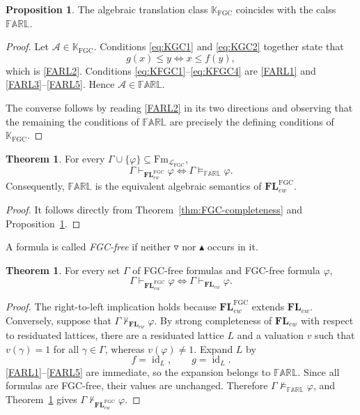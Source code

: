 \documentclass[final,12pt,times]{elsarticle}
\theoremstyle{plain}
\theoremstyle{definition}
\newtheorem{theorem}[definition]{Theorem}
\newtheorem{proposition}[definition]{Proposition}
\theoremstyle{break}
\newcommand{\FARL}{\mathbb{FARL}}
\begin{document}
\begin{proposition}\label{prop:identify-KFGC-FARL}
The algebraic translation class $\mathbb K_{\mathrm{FGC}}$ coincides with the calss
$\FARL$.
\end{proposition}

\begin{proof}
Let $\mathscr{A}\in\mathbb K_{\mathrm{FGC}}$.  Conditions
\eqref{eq:KGC1} and \eqref{eq:KGC2} together state that
\[
 g(x)\le y\Longleftrightarrow x\le f(y),
\]
which is \eqref{FARL2}.  Conditions
\eqref{eq:KFGC1}--\eqref{eq:KFGC4} are
\eqref{FARL1} and \eqref{FARL3}--\eqref{FARL5}.  Hence
$\mathscr{A}\in\FARL$.  

The converse follows by reading
\eqref{FARL2} in its two directions and observing that the remaining the conditions of $\FARL$
are precisely the defining conditions of
$\mathbb K_{\mathrm{FGC}}$.
\end{proof}

\begin{theorem}\label{thm:FARL-strong-completeness}
For every $\Gamma\cup\{\varphi\}\subseteq
\mathrm{Fm}_{\mathcal L_{\mathrm{FGC}}}$,
\[
 \Gamma\vdash_{\mathbf{FL}^{\mathrm{FGC}}_{ew}}\varphi
 \Longleftrightarrow
 \Gamma\models_{\FARL}\varphi.
\]
Consequently, $\FARL$ is the equivalent algebraic semantics of
$\mathbf{FL}^{\mathrm{FGC}}_{ew}$.
\end{theorem}

\begin{proof}
It follows directly from Theorem~\ref{thm:FGC-completeness} and
Proposition~\ref{prop:identify-KFGC-FARL}.
\end{proof}

A formula is called \emph{FGC-free} if neither
$\triangledown$ nor $\blacktriangle$ occurs in it.

\begin{theorem}\label{thm:FGC-conservativity}
For every set $\Gamma$ of FGC-free formulas and FGC-free formula
$\varphi$,
\[
 \Gamma\vdash_{\mathbf{FL}^{\mathrm{FGC}}_{ew}}\varphi
 \Longleftrightarrow
 \Gamma\vdash_{\mathbf{FL}_{ew}}\varphi.
\]
\end{theorem}

\begin{proof}
The right-to-left implication holds because
$\mathbf{FL}^{\mathrm{FGC}}_{ew}$ extends $\mathbf{FL}_{ew}$.  Conversely,
suppose that $\Gamma\nvdash_{\mathbf{FL}_{ew}}\varphi$.  By strong completeness
of $\mathbf{FL}_{ew}$ with respect to residuated lattices, there are a
residuated lattice $L$ and a valuation $v$ such that
$v(\gamma)=1$ for all $\gamma\in\Gamma$, whereas $v(\varphi)\ne1$.
Expand $L$ by
\[
 f=\operatorname{id}_L,
 \qquad
 g=\operatorname{id}_L.
\]
\eqref{FARL1}--\eqref{FARL5} are immediate, so the expansion
belongs to $\FARL$.  Since all formulas are
FGC-free, their values are unchanged.  Therefore
$\Gamma\not\models_{\FARL}\varphi$, and
Theorem~\ref{thm:FARL-strong-completeness} gives
$\Gamma\nvdash_{\mathbf{FL}^{\mathrm{FGC}}_{ew}}\varphi$.
\end{proof}
\end{document}
